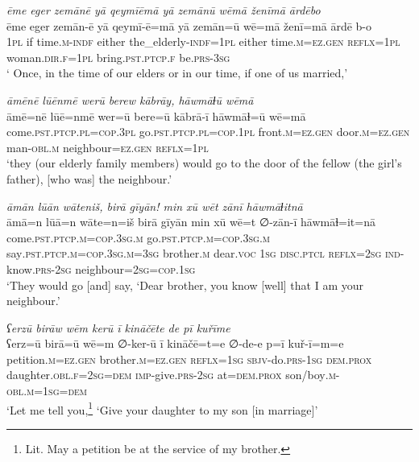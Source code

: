 \ea \label{RE.2}
\textit{ēme eger zemānē yā qeymīēmā yā zemānū wēmā ženīmā ārdēbo} \\ 
\gll ēme eger zemān-ē yā qeymī-ē=mā yā zemān=ū wē=mā ženī=mā ārdē b-o \\ 
 \textsc{1pl} if time\textsc{.m}\textsc{-indf} either the\_elderly\textsc{-indf}\textsc{=\textsc{1pl}} either time\textsc{.m}\textsc{\textsc{=ez.gen}} \textsc{reflx}\textsc{=\textsc{1pl}} woman\textsc{.dir}\textsc{.f}\textsc{=\textsc{1pl}} bring\textsc{.pst}\textsc{.ptcp}\textsc{.f} be\textsc{.prs}\textsc{-3sg} \\ 
\glt ` Once, in the time of our elders or in our time, if one of us married,'
\z 
 
\ea \label{RE.3}
\textit{āmēnē lūēnmē werū berew kābrāy, hāwmāɫū wēmā} \\ 
\gll āmē=nē lūē=nmē wer=ū bere=ū kābrā-ī hāwmāɫ=ū wē=mā \\ 
 come\textsc{.pst}\textsc{.ptcp}\textsc{.pl}\textsc{=cop}\textsc{.3pl} go\textsc{.pst}\textsc{.ptcp}\textsc{.pl}\textsc{=cop}\textsc{.\textsc{1pl}} front\textsc{.m}\textsc{\textsc{=ez.gen}} door\textsc{.m}\textsc{\textsc{=ez.gen}} man\textsc{-obl}\textsc{.m} neighbour\textsc{\textsc{=ez.gen}} \textsc{reflx}\textsc{=\textsc{1pl}} \\ 
\glt `they (our elderly family members) would go to the door of the fellow (the girl’s father), [who was] the neighbour.'
\z 
 
\ea \label{RE.5}
\textit{āmān lūān wāteniš, birā gīyān! min xū wēt zānī hāwmāɫitnā} \\ 
\gll āmā=n lūā=n wāte=n=iš birā gīyān min xū wē=t ∅-zān-ī hāwmāɫ=it=nā \\ 
 come\textsc{.pst}\textsc{.ptcp}\textsc{.m}\textsc{=cop}\textsc{.3sg}\textsc{.m} go\textsc{.pst}\textsc{.ptcp}\textsc{.m}\textsc{=cop}\textsc{.3sg}\textsc{.m} say\textsc{.pst}\textsc{.ptcp}\textsc{.m}\textsc{=cop}\textsc{.3sg}\textsc{.m}\textsc{=3sg} brother\textsc{.m} dear.\textsc{voc} \textsc{1sg} \textsc{disc.ptcl} \textsc{reflx}\textsc{=\textsc{2sg}} \textsc{ind-}know\textsc{.prs}-\textsc{2sg} neighbour\textsc{=\textsc{2sg}}\textsc{=cop}\textsc{.\textsc{1sg}} \\ 
\glt `They would go [and] say, ‘Dear brother, you know [well] that I am your neighbour.'
\z 
 
\ea \label{RE.7}
\textit{ʕerzū birāw wēm kerū ī kināčēte de pī kuřīme} \\ 
\gll ʕerz=ū birā=ū wē=m ∅-ker-ū ī kināčē=t=e ∅-de-e p=ī kuř-ī=m=e \\ 
 petition\textsc{.m}\textsc{\textsc{=ez.gen}} brother\textsc{.m}\textsc{\textsc{=ez.gen}} \textsc{reflx}\textsc{=\textsc{1sg}} \textsc{sbjv-}do\textsc{.prs}\textsc{-\textsc{1sg}} \textsc{dem.prox} daughter\textsc{.obl}\textsc{.f}\textsc{=\textsc{2sg}}\textsc{=dem} \textsc{imp-}give\textsc{.prs}-\textsc{2sg} at=\textsc{dem.prox} son/boy\textsc{.m}\textsc{-obl}\textsc{.m}\textsc{=\textsc{1sg}}\textsc{=dem} \\ 
\glt `Let me tell you,\footnote{Lit. May a petition be at the service of my brother.} ‘Give your daughter to my son [in marriage]'
\z 
 
